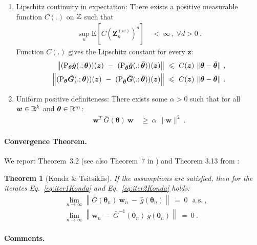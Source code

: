 \documentclass{article}
\newtheorem{theorem}{Theorem}
\newcommand\Bg{\bm{g}}
\newcommand\Bw{\bm{w}}
\newcommand\Bz{\bm{z}}
\newcommand\BG{\bm{G}}
\newcommand\BZ{\bm{Z}}
\newcommand\Bth{\bm{\theta}}
\newcommand{\rE}{\mathrm{E}} \newcommand{\rF}{\mathrm{F}}
\renewcommand{\leq}{\leqslant}
\renewcommand{\geq}{\geqslant}
\begin{document}
\begin{enumerate}[label=\textbf{(A\arabic*)}]
\begin{enumerate}
\item Lipschitz continuity in expectation:
There exists a positive measurable function $C(.)$ on $\mathbb{Z}$ such that
\begin{align}
\sup_n \rE \left[C(\BZ^{(w)}_{n} )^d \right] \ &< \ \infty
  \ , \ \forall d > 0 \ .
\end{align}
Function $C(.)$ gives the Lipschitz constant for every $\Bz$:
\begin{align}
\left\| (\rP_{\Bth} \hat{\Bg}(.;\Bth))(\Bz) \ - \
       (\rP_{\bar{\Bth}} \hat{\Bg}(.;\bar{\Bth}))(\Bz) \right\|
\ &\leq \ C(\Bz) \ \| \Bth - \bar{\Bth} \| \ ,\\
\left\| (\rP_{\Bth} \hat{\BG}(.;\Bth))(\Bz) \ - \
       (\rP_{\bar{\Bth}} \hat{\BG}(.;\bar{\Bth}))(\Bz) \right\|
\ &\leq \ C(\Bz) \ \| \Bth - \bar{\Bth} \| \ .
\end{align}

\item Uniform positive definiteness:
There exists some $\alpha>0$ such that for all $\Bw \in \dR^k$ and $\Bth
\in \dR^m$:
\begin{align}
\Bw^{T} \ \bar{G}(\Bth) \ \Bw \ &\geq \ \alpha \ \| \Bw \|^2 \ .
\end{align}
\end{enumerate}

\end{enumerate}

\paragraph{Convergence Theorem.}

We report Theorem~3.2 (see also  Theorem~7 in \cite{Konda:03})
and Theorem 3.13 from \cite{Konda:02}:

\begin{theorem}[Konda \& Tsitsiklis]
\label{th:konda}
If the assumptions are satisfied,
then for the iterates Eq.~\eqref{eq:iter1Konda} and Eq.~\eqref{eq:iter2Konda}
holds:
\begin{align}
&\lim_{n \to \infty} \left\| \bar{G}(\Bth_n) \ \Bw_n \ - \
  \bar{g}(\Bth_n) \right\| \ = \ 0 \ \ \ \text{a.s.} \ , \\
&\lim_{n \to \infty} \left\| \Bw_n \ - \ \bar{G}^{-1}(\Bth_n) \
  \bar{g}(\Bth_n) \right\| \ = \ 0 \ .
\end{align}
\end{theorem}


\paragraph{Comments.}
\end{document}
